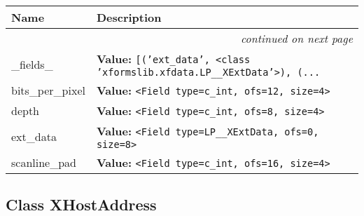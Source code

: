     \vspace{-1cm}
\hspace{\varindent}\begin{longtable}{|p{\varnamewidth}|p{\vardescrwidth}|l}
\cline{1-2}
\cline{1-2} \centering \textbf{Name} & \centering \textbf{Description}& \\
\cline{1-2}
\endhead\cline{1-2}\multicolumn{3}{r}{\small\textit{continued on next page}}\\\endfoot\cline{1-2}
\endlastfoot\raggedright \_\-f\-i\-e\-l\-d\-s\-\_\- & \raggedright \textbf{Value:} 
{\tt \texttt{[}\texttt{(}\texttt{'}\texttt{ext\_data}\texttt{'}\texttt{, }{\textless}class 'xformslib.xfdata.LP\_\_XExtData'{\textgreater}\texttt{)}\texttt{, }\texttt{(}\texttt{...}}&\\
\cline{1-2}
\raggedright b\-i\-t\-s\-\_\-p\-e\-r\-\_\-p\-i\-x\-e\-l\- & \raggedright \textbf{Value:} 
{\tt {\textless}Field type=c\_int, ofs=12, size=4{\textgreater}}&\\
\cline{1-2}
\raggedright d\-e\-p\-t\-h\- & \raggedright \textbf{Value:} 
{\tt {\textless}Field type=c\_int, ofs=8, size=4{\textgreater}}&\\
\cline{1-2}
\raggedright e\-x\-t\-\_\-d\-a\-t\-a\- & \raggedright \textbf{Value:} 
{\tt {\textless}Field type=LP\_\_XExtData, ofs=0, size=8{\textgreater}}&\\
\cline{1-2}
\raggedright s\-c\-a\-n\-l\-i\-n\-e\-\_\-p\-a\-d\- & \raggedright \textbf{Value:} 
{\tt {\textless}Field type=c\_int, ofs=16, size=4{\textgreater}}&\\
\cline{1-2}
\end{longtable}



\subsection{Class XHostAddress}

